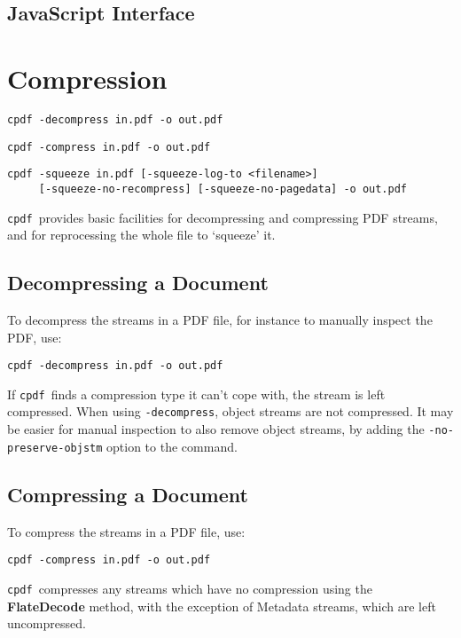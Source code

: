 \documentclass{book}
\newcommand{\cpdf}{\texttt{cpdf}}
\begin{document}
\begin{jscpdflib}
\clearpage
\section*{JavaScript Interface}
\begin{small}\tt

\end{small}
\end{jscpdflib}

\chapter{Compression}\label{chap:5}
  \begin{framed}
     \small\noindent\verb!cpdf -decompress in.pdf -o out.pdf!

     \vspace{1.5mm}
     \noindent\verb!cpdf -compress in.pdf -o out.pdf!
     
     \vspace{1.5mm}
     \noindent\verb!cpdf -squeeze in.pdf [-squeeze-log-to <filename>]!\\
     \noindent\verb!     [-squeeze-no-recompress] [-squeeze-no-pagedata] -o out.pdf!   
   \end{framed}
  \cpdf\ provides basic facilities for decompressing and compressing PDF streams, and for reprocessing the whole file to `squeeze' it.
  \section{Decompressing a Document}
  To decompress the streams in a PDF file, for instance to manually inspect the
PDF, use:
  \begin{framed}
   \small\verb!cpdf -decompress in.pdf -o out.pdf!
  \end{framed}
  \noindent If \cpdf\ finds a compression type it can't cope with, the stream is left compressed. When using \texttt{-decompress}, object streams are not compressed. It may be easier for manual inspection to also remove object streams, by adding the \texttt{-no-preserve-objstm} option to the command.
  \section{Compressing a Document}
  To compress the streams in a PDF file, use:
  \begin{framed}
    \small\verb!cpdf -compress in.pdf -o out.pdf!
  \end{framed}
  \noindent\cpdf\ compresses any streams which have no compression using the
  \textbf{Flate\-Decode} method, with the exception of Metadata streams, which
  are left uncompressed.
  
\end{document}
